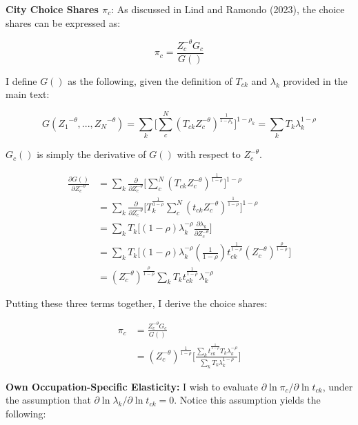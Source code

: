 \documentclass[10pt]{article}
\begin{document}
\noindent\textbf{City Choice Shares $\pi_{c}$}: As discussed in Lind and Ramondo (2023), the choice shares can be expressed as:

\begin{equation*}
    \pi_{c}=\frac{Z_{c}^{-\theta}{G_{c}}}{G()}
\end{equation*}

I define $G()$ as the following, given the definition of $T_{ck}$ and $\lambda_{k}$ provided in the main text:

\begin{equation*}
    G({Z_{1}}^{-\theta},...,{Z_{N}}^{-\theta})=\sum\limits_{k}\Big[\sum\limits_{c}^{N}({T_{ck}}{Z_{c}^{-\theta}})^{\frac{1}{1-\rho_{k}}}\Big]^{1-\rho_{k}} = \sum\limits_{k}{T_{k}}\lambda^{1-\rho}_{k}
\end{equation*}

$G_{c}()$ is simply the derivative of $G()$ with respect to $Z_{c}^{-\theta}$.

\begin{align*}
    \frac{\partial{G()}}{\partial{Z_{c}^{-\theta}}} & = \sum\limits_{k}\frac{\partial}{\partial{Z_{c}^{-\theta}}}\Big[\sum\limits_{c}^{N}({T_{ck}}{Z_{c}^{-\theta}})^{\frac{1}{1-\rho}}\Big]^{1-\rho} \\ &= \sum\limits_{k}\frac{\partial}{\partial{Z_{c}^{-\theta}}}\Big[{T^{\frac{1}{1-\rho}}_{k}}\sum\limits_{c}^{N}({t_{ck}}{Z_{c}^{-\theta}})^{\frac{1}{1-\rho}}\Big]^{1-\rho} \\ &= \sum\limits_{k}{T_{k}}\Big[(1-\rho)\lambda^{-\rho}_{k}\frac{\partial{\lambda_{k}}}{\partial{Z_{c}^{-\theta}}}\Big] \\ &= \sum\limits_{k}{T_{k}}\Big[(1-\rho)\lambda^{-\rho}_{k}(\frac{1}{1-\rho}){t^{\frac{1}{1-\rho}}_{ck}}(Z_{c}^{-\theta})^{\frac{\rho}{1-\rho}}\Big]\\ &= (Z_{c}^{-\theta})^{\frac{\rho}{1-\rho}}\sum\limits_{k}{T_{k}}{t^{\frac{1}{1-\rho}}_{ck}}\lambda_{k}^{-\rho}
\end{align*}

Putting these three terms together, I derive the choice shares:

\begin{align*}
    \pi_{c} & = \frac{Z_{c}^{-\theta}{G_{c}}}{G()} \\ &= (Z_{c}^{-\theta})^{\frac{1}{1-\rho}}\Bigg[\frac{\sum\limits_{k}{t^{\frac{1}{1-\rho}}_{ck}}{T_{k}}\lambda_{k}^{-\rho}}{\sum\limits_{k}{T_{k}}\lambda_{k}^{1-\rho}}\Bigg]
\end{align*}

\noindent\textbf{Own Occupation-Specific Elasticity:} I wish to evaluate $\partial\ln{\pi_{c}}/\partial\ln{t_{ck}}$, under the assumption that $\partial\ln{\lambda_{k}}/\partial\ln{t_{ck}}=0$. Notice this assumption yields the following:
\end{document}
